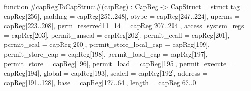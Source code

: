 function #\hyperref[zcapRegToCapStruct]{capRegToCapStruct}#(capReg) : CapReg -> CapStruct =
  struct {
    tag                        = capReg[256],
    padding                    = capReg[255..248],
    otype                      = capReg[247..224],
    uperms                     = capReg[223..208],
    perm_reserved11_14         = capReg[207..204],
    access_system_regs         = capReg[203],
    permit_unseal              = capReg[202],
    permit_ccall               = capReg[201],
    permit_seal                = capReg[200],
    permit_store_local_cap     = capReg[199],
    permit_store_cap           = capReg[198],
    permit_load_cap            = capReg[197],
    permit_store               = capReg[196],
    permit_load                = capReg[195],
    permit_execute             = capReg[194],
    global                     = capReg[193],
    sealed                     = capReg[192],
    address                    = capReg[191..128],
    base                       = capReg[127..64],
    length                     = capReg[63..0]
  }
